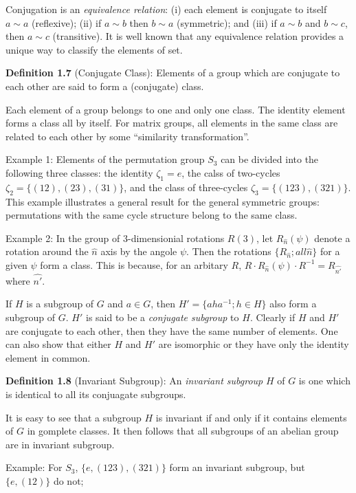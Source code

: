Conjugation is an \textit{equivalence relation}: (i) each element is conjugate to itself $a \sim a$ (reflexive); (ii) if $a \sim b$ then $b \sim a$ (symmetric); and (iii) if $a \sim b$ and $b \sim c$, then $a \sim c$ (transitive).
It is well known that any equivalence relation provides a unique way to classify the elements of set.

\textbf{Definition 1.7} (Conjugate Class): Elements of a group which are conjugate to each other are said to form a (conjugate) class.

Each element of a group belongs to one and only one class.
The identity element forms a class all by itself.
For matrix groups, all elements in the same class are related to each other by some ``similarity transformation''.

\textrm{Example 1}: Elements of the permutation group $S_{3}$ can be divided into the following three classes: the identity $\zeta_{1} = e$, the calss of two-cycles $\zeta_{2} = \{\left(12\right), \left(23\right), \left(31\right)\}$, and the class of three-cycles $\zeta_{3}=\{\left(123\right),\left(321\right)\}$.
This example illustrates a general result for the general symmetric groups: permutations with the same cycle structure belong to the same class.

\textrm{Example 2}: In the group of 3-dimensionial rotations $R\left(3\right)$, let $R_{\hat{n}}\left(\psi\right)$ denote a rotation around the $\hat{n}$ axis by the angole $\psi$.
Then the rotations $\{R_{\hat{n}}; all \hat{n} \}$ for a given $\psi$ form a class.
This is because, for an arbitary $R$, $R \cdot R_{\hat{n}}\left(\psi\right) \cdot R^{-1} = R_{\hat{n'}}$ where $\hat{n'}$.

If $H$ is a subgroup of $G$ and $a \in G$, then $H' = \{ aha^{-1}; h \in H \}$ also form a subgroup of $G$.
$H'$ is said to be a \textit{conjugate subgroup} to $H$.
Clearly if $H$ and $H'$ are conjugate to each other, then they have the same number of elements.
One can also show that either $H$ and $H'$ are isomorphic or  they have only the identity element in common.

\textbf{Definition 1.8} (Invariant Subgroup): An \textit{invariant subgroup} $H$ of $G$ is one which is identical to all its conjuagate subgroups.

It is easy to see that a subgroup $H$ is invariant if and only if it contains elements of $G$ in gomplete classes.
It then follows that all subgroups of an abelian group are in invariant subgroup.

\textrm{Example}: For $S_{3}$, $\{e, \left(123\right), \left(321\right)\}$ form an invariant subgroup, but $\{e, \left(12\right)\}$ do not;

